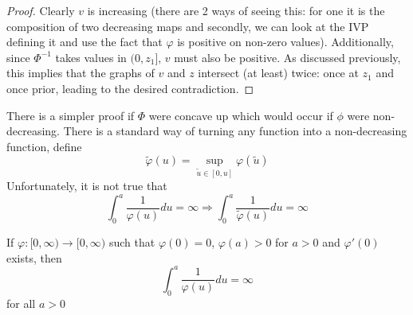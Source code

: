 \begin{proof}
    Clearly $v$ is increasing (there are 2 ways of seeing this: for one it is the composition of two decreasing maps and secondly, we can look at the IVP defining it and use the fact that $\varphi$ is positive on non-zero values). Additionally, since $\Phi^{-1}$ takes values in $(0, z_1]$, $v$ must also be positive. As discussed previously, this implies that the graphs of $v$ and $z$ intersect (at least) twice: once at $z_1$ and once prior, leading to the desired contradiction.
\end{proof}
\begin{remark}
    There is a simpler proof if $\Phi$ were concave up which would occur if $\phi$ were non-decreasing. There is a standard way of turning any function into a non-decreasing function, define
    $$ \tilde{\varphi}(u) = \sup_{\tilde{u} \in [0, u]} \varphi(\tilde{u}) $$
    Unfortunately, it is not true that
    $$ \int_{0}^{a} \frac{1}{\varphi(u)} du = \infty \Rightarrow \int_{0}^{a} \frac{1}{\tilde{\varphi}(u)} du = \infty $$
\end{remark}
\begin{remark}
    If $\varphi: [0, \infty) \to [0, \infty)$ such that $\varphi(0) = 0$, $\varphi(a) > 0$ for $a > 0$ and $\varphi'(0)$ exists, then
    $$ \int_{0}^{a} \frac{1}{\varphi(u)} du = \infty $$
    for all $a > 0$
\end{remark}

